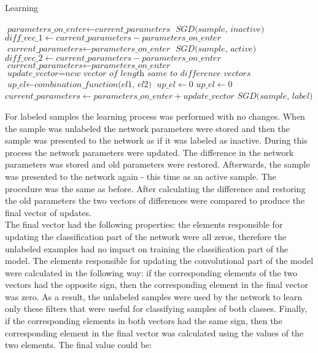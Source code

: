 \documentclass[a4paper,10pt]{report}
\begin{document}
      \begin{algorithm}
      \caption{Learning}\label{euclid}
      \begin{algorithmic}[1]
	\State $\textit{parameters\_on\_enter} \gets \textit{current\_parameters}$
	\State
	\State $\textit{SGD(sample, inactive)}$
	\State $\textit{diff\_vec\_1} \gets \textit{current\_parameters} -\textit{parameters\_on\_enter}$
	\State $\textit{current\_parameters} \gets \textit{parameters\_on\_enter}$
	\State
	\State $\textit{SGD(sample, active)}$
	\State $\textit{diff\_vec\_2} \gets \textit{current\_parameters} - \textit{parameters\_on\_enter}$
	\State $\textit{current\_parameters} \gets \textit{parameters\_on\_enter}$
	\State
	\State $\textit{update\_vector} = \textit{new vector of length same to difference vectors}$
	    \State $\textit{up\_el} \gets \textit{combination\_function(el1, el2)}$
	  \Else
	    \State $\textit{up\_el} \gets 0$
	  \EndIf
	\EndFor
	\State
	    \State $\textit{up\_el} \gets 0$
	  \EndIf
	\EndFor
	\State
	\State $\textit{current\_parameters} \gets \textit{parameters\_on\_enter} + \textit{update\_vector}$
	\Else
	\State $\textit{SGD(sample, label)}$
      \EndIf
      \State
      \EndProcedure
      \end{algorithmic}
      \end{algorithm}
      
      For labeled samples the learning process was performed with no changes. When the sample was unlabeled the network parameters were stored and then the sample was presented to the network as if it was labeled as inactive. During this process the network parameters were updated. The difference in the network parameters was stored and old parameters were restored. Afterwards, the sample was presented to the network again - this time as an active sample. The procedure was the same as before. After calculating the difference and restoring the old parameters the two vectors of differences were compared to produce the final vector of updates.\\
           
      The final vector had the following properties: the elements responsible for updating the classification part of the network were all zeros, therefore the unlabeled examples had no impact on training the classification part of the model. The elements responsible for updating the convolutional part of the model were calculated in the following way: if the corresponding elements of the two vectors had the opposite sign, then the corresponding element in the final vector was zero. As a result, the unlabeled samples were used by the network to learn only these filters that were useful for classifying samples of both classes. Finally, if the corresponding elements in both vectors had the same sign, then the corresponding element in the final vector was calculated using the values of the two elements. The final value could be:
      
\end{document}
